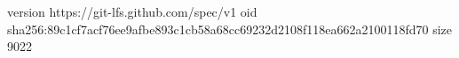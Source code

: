 version https://git-lfs.github.com/spec/v1
oid sha256:89c1cf7acf76ee9afbe893c1cb58a68cc69232d2108f118ea662a2100118fd70
size 9022
